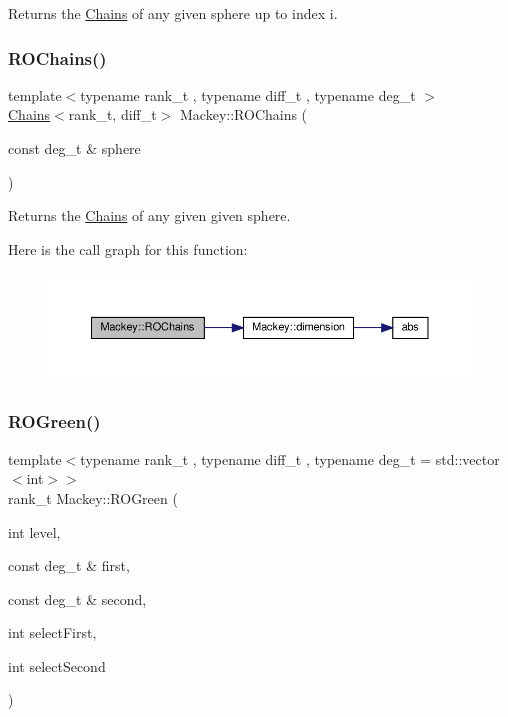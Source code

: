 Returns the \hyperlink{classMackey_1_1Chains}{Chains} of any given sphere up to index i. 

\mbox{\label{namespaceMackey_abd3c2e12c91baa573c6dbaa37eeb0518}} 
\subsubsection{\texorpdfstring{R\+O\+Chains()}{ROChains()}\hspace{0.1cm}{\footnotesize\ttfamily [2/2]}}
{\footnotesize\ttfamily template$<$typename rank\+\_\+t , typename diff\+\_\+t , typename deg\+\_\+t $>$ \\
\hyperlink{classMackey_1_1Chains}{Chains}$<$rank\+\_\+t, diff\+\_\+t$>$ Mackey\+::\+R\+O\+Chains (\begin{DoxyParamCaption}\item[{const deg\+\_\+t \&}]{sphere }\end{DoxyParamCaption})}



Returns the \hyperlink{classMackey_1_1Chains}{Chains} of any given given sphere. 

Here is the call graph for this function\+:\nopagebreak
\begin{figure}[H]
\begin{center}
\leavevmode
\includegraphics[width=350pt]{namespaceMackey_abd3c2e12c91baa573c6dbaa37eeb0518_cgraph}
\end{center}
\end{figure}
\mbox{\label{namespaceMackey_a2bd86833844ca62d76c47a54aeb0bb77}} 
\subsubsection{\texorpdfstring{R\+O\+Green()}{ROGreen()}\hspace{0.1cm}{\footnotesize\ttfamily [1/2]}}
{\footnotesize\ttfamily template$<$typename rank\+\_\+t , typename diff\+\_\+t , typename deg\+\_\+t  = std\+::vector$<$int$>$$>$ \\
rank\+\_\+t Mackey\+::\+R\+O\+Green (\begin{DoxyParamCaption}\item[{int}]{level,  }\item[{const deg\+\_\+t \&}]{first,  }\item[{const deg\+\_\+t \&}]{second,  }\item[{int}]{select\+First,  }\item[{int}]{select\+Second }\end{DoxyParamCaption})}




